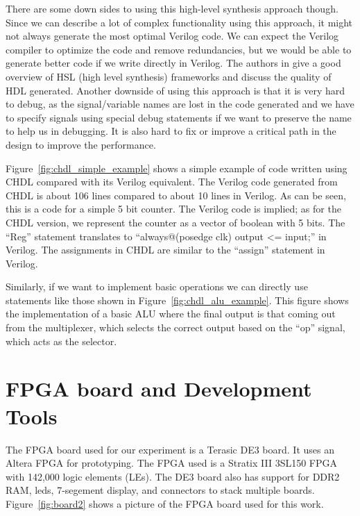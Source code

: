 There are some down sides to using this high-level synthesis approach though. Since we can describe a lot of complex functionality using this approach, it might not always generate the most optimal Verilog code. We can expect the Verilog compiler to optimize the code and remove redundancies, but we would be able to generate better code if we write directly in Verilog. The authors in \cite{hls_overview} give a good overview of HSL (high level synthesis) frameworks and discuss the quality of HDL generated. Another downside of using this approach is that it is very hard to debug, as the signal/variable names are lost in the code generated and we have to specify signals using special debug statements if we want to preserve the name to help us in debugging. It is also hard to fix or improve a critical path in the design to improve the performance.%

Figure~\ref{fig:chdl_simple_example} shows a simple example of code written using CHDL compared with its Verilog equivalent. The Verilog code generated from CHDL is about 106 lines compared to about 10 lines in Verilog. As can be seen, this is a code for a simple 5 bit counter. The Verilog code is implied; as for the CHDL version, we represent the counter as a vector of boolean with 5 bits. The ``Reg'' statement translates to ``always@(posedge clk) output \textless= input;'' in Verilog. The assignments in CHDL are similar to the ``assign'' statement in Verilog.


Similarly, if we want to implement basic operations we can directly use statements like those shown in Figure~\ref{fig:chdl_alu_example}. This figure shows the implementation of a basic ALU where the final output is that coming out from the multiplexer, which selects the correct output based on the ``op'' signal, which acts as the selector.


\section{FPGA board and Development Tools}
The FPGA board used for our experiment is a Terasic DE3 board. It uses an Altera FPGA for prototyping. The FPGA used is a Stratix III 3SL150 FPGA with 142,000 logic elements (LEs). The DE3 board also has support for DDR2 RAM, leds, 7-segement display, and connectors to stack multiple boards. Figure~\ref{fig:board2} shows a picture of the FPGA board used for this work. 

